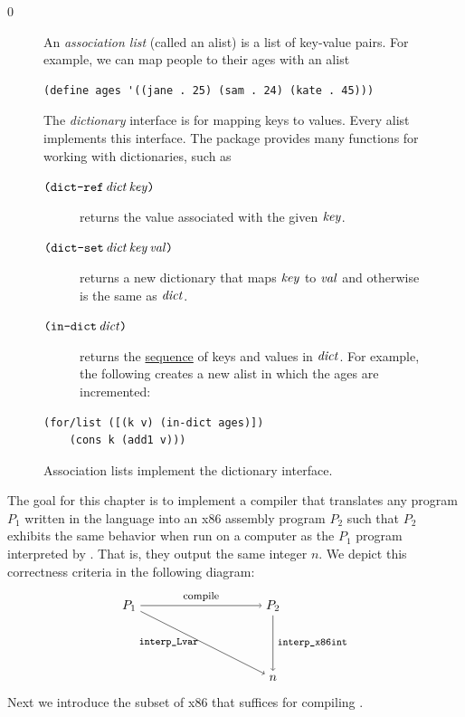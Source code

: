 \documentclass[7x10]{TimesAPriori_MIT}%
\def\racketEd{0}
\def\edition{1}
\numberwithin{theorem}{chapter}
\numberwithin{definition}{chapter}
\numberwithin{equation}{chapter}
\begin{document}
{\if\edition\racketEd
\begin{figure}[tp]
  \small
  \begin{tcolorbox}[title=Association Lists as Dictionaries]
  An \emph{association list} (called an alist) is a list of key-value pairs.
  For example, we can map people to their ages with an alist
  \begin{lstlisting}[basicstyle=\ttfamily]
  (define ages '((jane . 25) (sam . 24) (kate . 45)))
  \end{lstlisting}
  The \emph{dictionary} interface is for mapping keys to values.
  Every alist implements this interface.  
  The package
  \href{https://docs.racket-lang.org/reference/dicts.html}{}
  provides many functions for working with dictionaries, such as
  \begin{description}
  \item[$\texttt{(}\texttt{dict-ref}\,\mathit{dict}\,\mathit{key}\texttt{)}$]
    returns the value associated with the given $\mathit{key}$.
  \item[$\texttt{(}\texttt{dict-set}\,\mathit{dict}\,\mathit{key}\,\mathit{val}\texttt{)}$]
    returns a new dictionary that maps $\mathit{key}$ to $\mathit{val}$
    and otherwise is the same as $\mathit{dict}$.
  \item[$\texttt{(}\texttt{in-dict}\,\mathit{dict}\texttt{)}$] returns the
    \href{https://docs.racket-lang.org/reference/sequences.html}{sequence}
    of keys and values in $\mathit{dict}$. For example, the following
    creates a new alist in which the ages are incremented:
  \end{description}
  \vspace{-10pt}
  \begin{lstlisting}[basicstyle=\ttfamily]
  (for/list ([(k v) (in-dict ages)])
    (cons k (add1 v)))
  \end{lstlisting}
\end{tcolorbox}
  \caption{Association lists implement the dictionary interface.}
  \label{fig:alist}
\end{figure}
\fi}

The goal for this chapter is to implement a compiler that translates
any program $P_1$ written in the \LangVar{} language into an x86 assembly
program $P_2$ such that $P_2$ exhibits the same behavior when run on a
computer as the $P_1$ program interpreted by .
That is, they output the same integer $n$. We depict this correctness
criteria in the following diagram:
\[
\begin{tikzpicture}[baseline=(current  bounding  box.center)]
 \node (p1) at (0,  0)   {$P_1$};
 \node (p2) at (4,  0)   {$P_2$};
 \node (o)  at (4, -2) {$n$};

 \path[->] (p1) edge [above] node {\footnotesize compile} (p2);
 \path[->] (p1) edge [left]  node {\footnotesize\code{interp\_Lvar}} (o);
 \path[->] (p2) edge [right] node {\footnotesize\code{interp\_x86int}} (o);
\end{tikzpicture}
\]
Next we introduce the \LangXInt{} subset of x86 that suffices for
compiling \LangVar{}.
\end{document}
